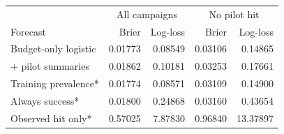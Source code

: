 \begin{tabular}{lrrrr}
\toprule
& \multicolumn{2}{c}{All campaigns} & \multicolumn{2}{c}{No pilot hit}\\
Forecast & Brier & Log-loss & Brier & Log-loss\\
\midrule
Budget-only logistic & 0.01773 & 0.08549 & 0.03106 & 0.14865\\
+ pilot summaries & 0.01862 & 0.10181 & 0.03253 & 0.17661\\
Training prevalence* & 0.01774 & 0.08571 & 0.03109 & 0.14900\\
Always success* & 0.01800 & 0.24868 & 0.03160 & 0.43654\\
Observed hit only* & 0.57025 & 7.87830 & 0.96840 & 13.37897\\
\bottomrule
\end{tabular}

